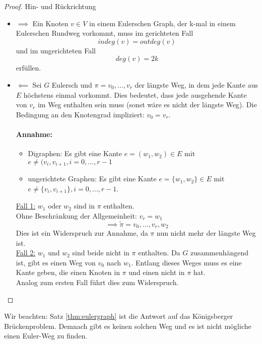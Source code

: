 \begin{proof}
Hin- und Rückrichtung
\begin{itemize}
	\item \underline{$\implies$} Ein Knoten $v \in  V$ in einem Eulerschen Graph, der k-mal in einem Eulerschen Rundweg vorkommt, muss im gerichteten Fall
		\[
		indeg(v) =outdeg(v)
		\]
und im ungerichteten Fall
\[
deg(v)=2k
\]
erfüllen.
\item \underline{$\impliedby$} Sei $G$ Eulersch und $\pi=v_0,\ldots,v_r$ der längste Weg, in dem jede Kante aus $E$ höchstens einmal vorkommt.
Dies bedeutet, dass jede ausgehende Kante von $v_r$ im Weg enthalten sein muss (sonst wäre es nicht der längste Weg).
Die Bedingung an den Knotengrad impliziert: $v_0=v_r$.
\paragraph{Annahme:}
\begin{itemize}
	\item Digraphen: Es gibt eine Kante $e=(w_1,w_2) \in  E $ mit \\$e \neq (v_i, v_{i+1}, i=0,\ldots,r-1$
	\item ungerichtete Graphen: Es gibt eine Kante $e=\{w_1,w_2\} \in  E$ mit $e \neq \{v_i,v_{i+1}\}, i=0,\ldots,r-1$.
\end{itemize}
\underline{Fall 1:} $w_1 \text{ oder }w_2$ sind in $\pi$ enthalten. \\
Ohne Beschränkung der Allgemeinheit: $v_r=w_1$
\[
\implies \tilde{\pi} =v_0,\ldots,v_r,w_2
\]
Dies ist ein Widerspruch zur Annahme, da $\pi$ nun nicht mehr der längste Weg ist. \\
\underline{Fall 2:} $w_1$ und $w_2$ sind beide nicht in $\pi$ enthalten.
Da $G$ zusammenhängend ist, gibt es einen Weg von $v_0$ nach $w_1$. Entlang dieses Weges muss es eine Kante geben, die einen Knoten in $\pi$ und einen nicht in $\pi$ hat. \\
Analog zum ersten Fall führt dies zum Widerspruch.
\end{itemize}
\end{proof}
Wir beachten: Satz \ref{thm:eulergraph} ist die Antwort auf das Königsberger Brückenproblem. Demnach gibt es keinen solchen Weg und es ist nicht mögliche einen Euler-Weg zu finden.
